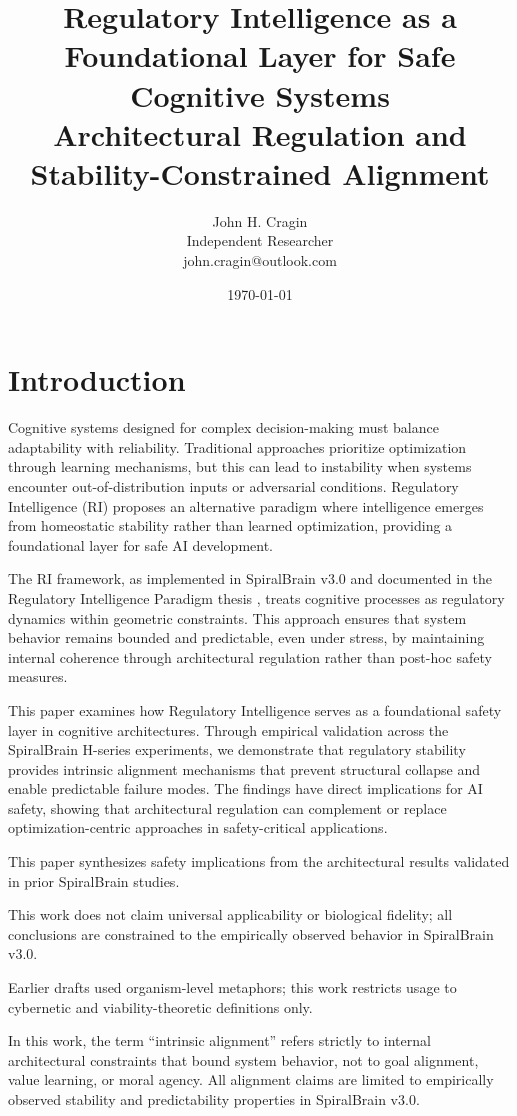 \documentclass[12pt,a4paper]{report}
\title{Regulatory Intelligence as a Foundational Layer for Safe Cognitive Systems\\
Architectural Regulation and Stability-Constrained Alignment}
\author{John H. Cragin \\
Independent Researcher \\
john.cragin@outlook.com}
\date{\today}
\begin{document}
\maketitle

\section{Introduction}

Cognitive systems designed for complex decision-making must balance adaptability with reliability. Traditional approaches prioritize optimization through learning mechanisms, but this can lead to instability when systems encounter out-of-distribution inputs or adversarial conditions. Regulatory Intelligence (RI) proposes an alternative paradigm where intelligence emerges from homeostatic stability rather than learned optimization, providing a foundational layer for safe AI development.

The RI framework, as implemented in SpiralBrain v3.0 and documented in the Regulatory Intelligence Paradigm thesis \cite{Cragin2026RI}, treats cognitive processes as regulatory dynamics within geometric constraints. This approach ensures that system behavior remains bounded and predictable, even under stress, by maintaining internal coherence through architectural regulation rather than post-hoc safety measures.

This paper examines how Regulatory Intelligence serves as a foundational safety layer in cognitive architectures. Through empirical validation across the SpiralBrain H-series experiments, we demonstrate that regulatory stability provides intrinsic alignment mechanisms that prevent structural collapse and enable predictable failure modes. The findings have direct implications for AI safety, showing that architectural regulation can complement or replace optimization-centric approaches in safety-critical applications.

This paper synthesizes safety implications from the architectural results validated in prior SpiralBrain studies.

This work does not claim universal applicability or biological fidelity; all conclusions are constrained to the empirically observed behavior in SpiralBrain v3.0.

Earlier drafts used organism-level metaphors; this work restricts usage to cybernetic and viability-theoretic definitions only.

In this work, the term ``intrinsic alignment'' refers strictly to internal architectural constraints that bound system behavior, not to goal alignment, value learning, or moral agency. All alignment claims are limited to empirically observed stability and predictability properties in SpiralBrain v3.0.
\end{document}
